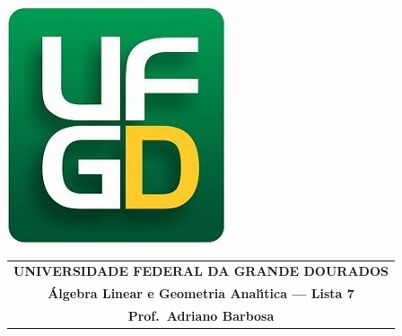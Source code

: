 \documentclass[a4paper,5pt]{amsbook}
\begin{document}
\thispagestyle{empty}
\pagestyle{empty}
\begin{minipage}[h]{0.14\textwidth}
	\includegraphics[scale=0.24]{../../ufgd.png}
\end{minipage}
\begin{minipage}[h]{\textwidth}
\begin{tabular}{c}
{{\bf UNIVERSIDADE FEDERAL DA GRANDE DOURADOS}}\\
{{\bf \'{A}lgebra Linear e Geometria Anal\'{\i}tica --- Lista 7}}\\
{{\bf Prof.\ Adriano Barbosa}}\\
\end{tabular}
\vspace{-0.45cm}
%
\end{minipage}

\end{document}
